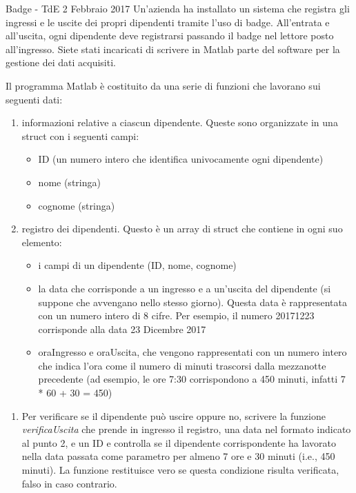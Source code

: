 \documentclass[aspectratio=169, ]{beamer}
\begin{document}
\begin{frame}[allowframebreaks]{Badge - TdE 2 Febbraio 2017}
    Un'azienda ha installato un sistema che registra gli ingressi e le uscite dei propri dipendenti tramite
    l'uso di badge.
    All'entrata e all'uscita, ogni dipendente deve registrarsi passando il badge nel lettore
    posto all'ingresso.
    Siete stati incaricati di scrivere in Matlab parte del software per la gestione dei
    dati acquisiti.

    \framebreak

    Il programma Matlab è costituito da una serie di funzioni che lavorano sui seguenti dati:
    \begin{enumerate}
        \item informazioni relative a ciascun dipendente. Queste sono organizzate in una struct con i
            seguenti campi:
            \begin{itemize}
                \item ID (un numero intero che identifica univocamente ogni dipendente)
                \item nome (stringa)
                \item cognome (stringa)
            \end{itemize}
        \item registro dei dipendenti. Questo è un array di struct che contiene in ogni suo elemento:
            \begin{itemize}
                \item i campi di un dipendente (ID, nome, cognome)
                \item la data che corrisponde a un ingresso e a un’uscita del dipendente (si suppone che
                    avvengano nello stesso giorno).
                    Questa data è rappresentata con un numero intero di 8 cifre.
                    Per esempio, il numero 20171223 corrisponde alla data 23 Dicembre 2017
                \item oraIngresso e oraUscita, che vengono rappresentati con un numero intero che indica
                    l’ora come il numero di minuti trascorsi dalla mezzanotte precedente (ad esempio, le
                    ore 7:30 corrispondono a 450 minuti, infatti 7 * 60 + 30 = 450)
            \end{itemize}
    \end{enumerate}

    \framebreak

    \begin{enumerate}
        \item Per verificare se il dipendente può uscire oppure no, scrivere la funzione \emph{verificaUscita} che
            prende in ingresso il registro, una data nel formato indicato al punto 2, e un ID e controlla se il
            dipendente corrispondente ha lavorato nella data passata come parametro per almeno 7 ore e 30
            minuti (i.e., 450 minuti). La funzione restituisce vero se questa condizione risulta verificata, falso in
            caso contrario.


\end{enumerate}
\end{frame}
\end{document}
